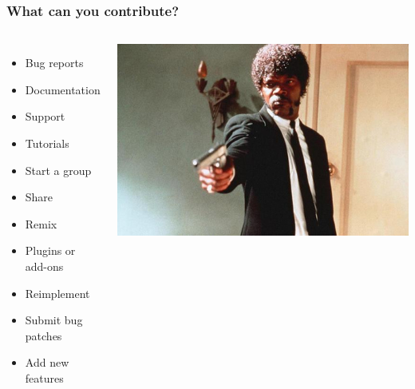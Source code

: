 \documentclass{beamer}
\begin{document}
\begin{frame}
  \frametitle{What can you contribute?}
  \begin{columns}[c]
    \begin{itemize}
    \item \textcolor<2>{beamer@mygrey}{Bug reports}
    \item \textcolor<2>{beamer@mygrey}{Documentation}
    \item \textcolor<2>{beamer@mygrey}{Support}
    \item \textcolor<2>{beamer@mygrey}{Tutorials}
    \item \textcolor<2>{beamer@mygrey}{Start a group}
    \item \textcolor<2>{beamer@mygrey}{Share}
    \item \textcolor<2>{beamer@mygrey}{Remix}
    \item \textcolor<2>{beamer@myblue}{Plugins or add-ons}
    \item \textcolor<2>{beamer@myblue}{Reimplement}
    \item \textcolor<2>{beamer@myblue}{Submit bug patches}
    \item \textcolor<2>{beamer@myblue}{Add new features}
    \end{itemize}
    \includegraphics[width=1\textwidth]{../img/say-what-again}
  \end{columns}
\end{frame}
\end{document}
